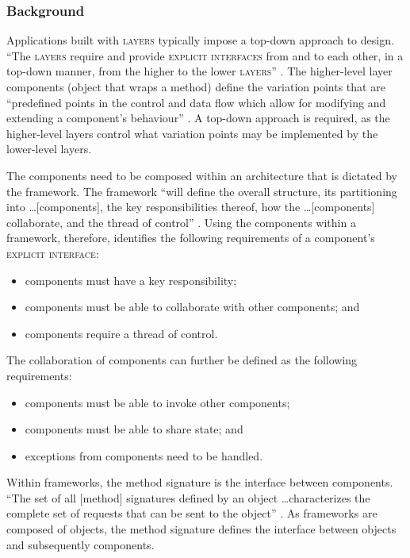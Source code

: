 \documentclass[prodmode]{style/acmlarge}
\begin{document}
\subsubsection*{Background}

Applications built with \textsc{layers} typically impose a top-down approach to
design.  ``The \textsc{layers} require and provide \textsc{explicit interfaces}
from and to each other, in a top-down manner, from the higher to the lower
\textsc{layers}'' \cite[p. 11]{ioc}.  The higher-level layer components (object
that wraps a method) define the variation points that are
``predefined points in the control and data flow which allow for modifying and
extending a component's behaviour'' \cite[p. 5]{ioc}.  A top-down approach is
required, as the higher-level layers control what variation points may be
implemented by the lower-level layers.

The components need to be composed within an architecture that is dictated by
the framework.  The framework ``will define the overall structure, its
partitioning into \ldots [components], the key responsibilities thereof, how the
\ldots [components] collaborate, and the thread of control'' \cite[p.26]{gof}.
Using the components within a framework, therefore, identifies the following
requirements of a component's \textsc{explicit interface}:
\begin{itemize}
  \item components must have a key responsibility;
  \item components must be able to collaborate with other components; and
  \item components require a thread of control.
\end{itemize}

The collaboration of components can further be defined as the following
requirements:
\begin{itemize}
  \item components must be able to invoke other components;
  \item components must be able to share state; and
  \item exceptions from components need to be handled.
\end{itemize}

Within frameworks, the method signature is the interface between components.
``The set of all [method] signatures defined by an object \ldots characterizes
the complete set of requests that can be sent to the object'' \cite[p. 13]{gof}.
As frameworks are composed of objects, the method signature defines the
interface between objects and subsequently components.
\end{document}
